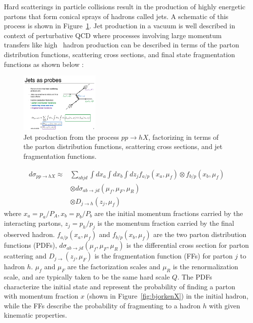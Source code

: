 

Hard scatterings in particle collisions result in the production of highly energetic partons that form conical sprays of hadrons called jets. A schematic of this process is shown in Figure~\ref{fig:feynman_jet}. Jet production in a vacuum is well described in context of perturbative QCD \cite{Sjostrand:2007gs} where processes involving large momentum transfers like high \pt\ hadron production can be described in terms of the parton distribution functions, scattering cross sections, and final state fragmentation functions as shown below \cite{Qin:2015srf}:


\begin{figure}[htbp]
\begin{center}
\includegraphics[width=0.35\textwidth]{figures/theory/feynman_jet}
\caption{Jet production from the process $pp \rightarrow hX$, factorizing in terms of the parton distribution functions, scattering cross sections, and jet fragmentation functions. \cite{Qin:2015srf}}
\label{fig:feynman_jet}
\end{center}
\end{figure}



\begin{align}
\label{eq:hadronCS}
d \sigma_{pp \rightarrow hX} \approx & \sum_{abjd} \int dx_a \int dx_b \int dz_j f_{a/p} (x_a, \mu_f) \otimes f_{b/p} (x_b, \mu_f) \\
& \otimes d\sigma_{ab\rightarrow jd} (\mu_f, \mu_F, \mu_R)  \nonumber \\
& \otimes D_{j \rightarrow h} (z_j, \mu_f) \nonumber
\end{align}
where $x_a = p_a/P_A, x_b = p_b / P_b$ are the initial momentum fractions carried by the interacting partons, $z_j = p_h / p_j$ is the momentum fraction carried by the final observed hadron. $f_{a/p} (x_a, \mu_f)$ and $f_{b/p} (x_b, \mu_f)$ are the two parton distribution functions (PDFs), $d\sigma_{ab\rightarrow jd} (\mu_f, \mu_F, \mu_R)$ is the differential cross section for parton scattering and $D_{j\rightarrow }(z_j,\mu_F)$ is the fragmentation function (FFs) for parton $j$ to hadron $h$. $\mu_f$ and $\mu_F$ are the factorization scales and $\mu_R$ is the renormalization scale, and are typically taken to be the same hard scale $Q$. The PDFs characterize the initial state and represent the probability of finding a parton with momentum fraction $x$ (shown in Figure~\ref{fig:bjorkenX}) in the initial hadron, while the FFs describe the probability of fragmenting to a hadron $h$ with given kinematic properties.

